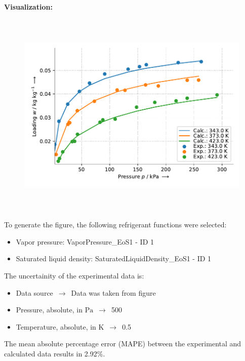 \textbf{Visualization:}
%
\begin{figure}[!htp]
{\noindent\includegraphics[height=10cm, keepaspectratio]{figs/ads/ads_Propane_carbon_molecular_sieve_4A_Toth_1.pdf}}
\end{figure}
%

To generate the figure, the following refrigerant functions were selected:
\begin{itemize}
\item Vapor pressure: VaporPressure\_EoS1 - ID 1
\item Saturated liquid density: SaturatedLiquidDensity\_EoS1 - ID 1
\end{itemize}

The uncertainity of the experimental data is:
\begin{itemize}
\item Data source $\,\to\,$ Data was taken from figure
\item Pressure, absolute, in $\si{\pascal}$ $\,\to\,$ 500
\item Temperature, absolute, in $\si{\kelvin}$ $\,\to\,$ 0.5
\end{itemize}

The mean absolute percentage error (MAPE) between the experimental and calculated data results in 2.92\%.
\FloatBarrier
\newpage
